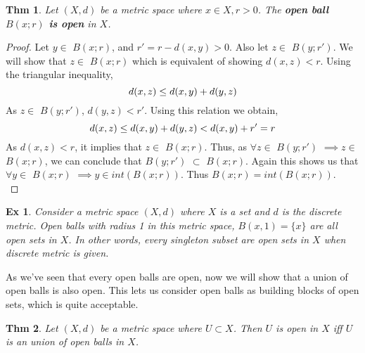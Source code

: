 \documentclass[paper=a4, fontsize=11pt]{scrartcl}
\newcommand{\ball}[2]{$B({#1};{#2})$}
\newtheorem{theorem}{Thm}
\newtheorem{example}{Ex}
\begin{document}
\begin{theorem}
	Let $(X,d)$ be a metric space where $x \in X , r>0$. The \textbf{open ball \ball{x}{r} is open} in $X$.\\
\end{theorem}
\begin{proof}
	Let $ y \in$ \ball{x}{r}, and $ r' = r - d(x,y) > 0$. Also let $ z\in$ \ball{y}{r'}. We will show that $z \in$ \ball{x}{r} which is equivalent of showing $d(x,z)<r$. Using the triangular inequality,
	\begin{equation}\nonumber
		d(x,z) \leq d(x,y)+d(y,z)\\
	\end{equation}
	As $z \in$ \ball{y}{r'}, $d(y,z)<r'$. Using this relation we obtain, 
	\begin{equation}\nonumber
	d(x,z) \leq d(x,y)+d(y,z)<d(x,y)+r'=r\\
	\end{equation}
	As $d(x,z)<r$, it implies that $z\in$ \ball{x}{r}. Thus, as $\forall z\in$ \ball{y}{r'} $\implies z \in$ \ball{x}{r}, we can conclude that \ball{y}{r'} $\subset$ \ball{x}{r}. Again this shows us that $\forall y \in$ \ball{x}{r} $\implies y \in int(B(x;r))$. Thus $B(x;r)=int(B(x;r))$.\\
\end{proof}

\begin{example}
	Consider a metric space $(X,d)$ where $X$ is a set and $d$ is the discrete metric. Open balls with radius 1 in this metric space, $B(x,1)=\{x\}$ are all open sets in $X$. In other words, every singleton subset are open sets in $X$ when discrete metric is given.\\ 
\end{example}

As we've seen that every open balls are open, now we will show that a union of open balls is also open. This lets us consider open balls as building blocks of open sets, which is quite acceptable.\\

\begin{theorem}
	Let $(X,d)$ be a metric space where $U \subset X$. Then $U$ is open in $X$ iff $U$ is an union of open balls in $X$. \\
\end{theorem}
\end{document}
